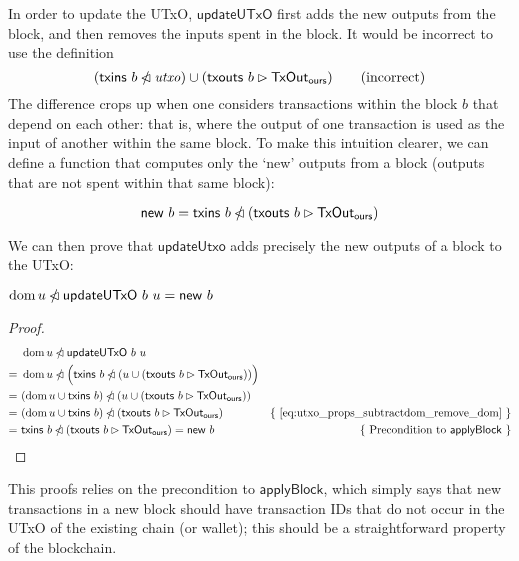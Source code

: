 \documentclass{article}
\newcommand{\restrictdom}{\lhd}
\newcommand{\subtractdom}{\mathbin{\slashed{\restrictdom}}}
\newcommand{\restrictrange}{\rhd}
\DeclareMathOperator{\dom}{dom}
\theoremstyle{definition}{
  \newtheorem{lemma}{Lemma}[section] %
  \newtheorem{definition}[lemma]{Definition}
}
\theoremstyle{theorem}{
  \newtheorem{invariant}[lemma]{Invariant}
  \newtheorem{proofobligation}[lemma]{Proof Obligation}
}
\numberwithin{equation}{lemma}
\begin{document}
In order to update the UTxO, $\mathsf{updateUTxO}$ first adds the new outputs
from the block, and then removes the inputs spent in the block. It would be
incorrect to use the definition
%
\begin{equation*}
(\mathsf{txins} ~ b \subtractdom \mathit{utxo})  \cup (\mathsf{txouts} ~ b \restrictrange \mathsf{TxOut_{ours}})
\tag{incorrect}
\end{equation*}
%
The difference crops up when one considers transactions within the block $b$
that depend on each other: that is, where the output of one transaction is used
as the input of another within the same block. To make this intuition clearer,
we can define a function that computes only the `new' outputs from a block
(outputs that are not spent within that same block):
%
\begin{definition}
\begin{equation*}
\mathsf{new} ~ b = \mathsf{txins} ~ b \subtractdom (\mathsf{txouts} ~ b \restrictrange \mathsf{TxOut_{ours}})
\end{equation*}
\end{definition}
%
We can then prove that $\mathsf{updateUtxo}$ adds precisely the new outputs
of a block to the UTxO:
%
\begin{lemma} \label{lem:update_remove_dom}
\begin{math}
\dom u \subtractdom \mathsf{updateUTxO} ~ b ~ u  = \mathsf{new} ~ b
\end{math}
\end{lemma}
%
\begin{proof}
\begin{align*}
  & ~ \dom u \subtractdom \mathsf{updateUTxO} ~ b ~ u \\
= & ~ \dom u \subtractdom \Bigl( \mathsf{txins} ~ b \subtractdom (u \cup (\mathsf{txouts} ~ b \restrictrange \mathsf{TxOut_{ours}})) \Bigr) \\
= & ~ (\dom u \cup \mathsf{txins} ~ b) \subtractdom (u \cup (\mathsf{txouts} ~ b \restrictrange \mathsf{TxOut_{ours}})) \\
= & ~ (\dom u \cup \mathsf{txins} ~ b) \subtractdom (\mathsf{txouts} ~ b \restrictrange \mathsf{TxOut_{ours}}) & \text{\{ \eqref{eq:utxo_props_subtractdom_remove_dom} \}} \\
= & ~ \mathsf{txins} ~ b \subtractdom (\mathsf{txouts} ~ b \restrictrange \mathsf{TxOut_{ours}}) = \mathsf{new} ~ b & \text{\{ Precondition to $\mathsf{applyBlock}$ \}}
\end{align*}
\end{proof}
%
This proofs relies on the precondition to $\mathsf{applyBlock}$, which simply
says that new transactions in a new block should have transaction IDs that do
not occur in the UTxO of the existing chain (or wallet); this should be a
straightforward property of the blockchain.
\end{document}
